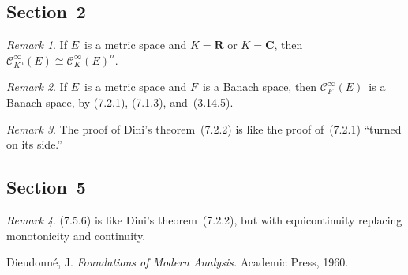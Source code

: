 \documentclass[letterpaper,12pt]{article}
\newcommand{\R}{\mathbf{R}}
\newcommand{\C}{\mathbf{C}}
\newcommand{\BC}{\mathcal{C}^{\infty}}
\newcommand{\iso}{\cong}
\theoremstyle{plain}
\theoremstyle{definition}
\theoremstyle{remark}
\newtheorem*{rmk}{Remark}
\begin{document}
\subsection*{Section~2}
\begin{rmk}
If \(E\)~is a metric space and \(K=\R\) or \(K=\C\), then \(\BC_{K^n}(E)\iso\BC_K(E)^n\).
\end{rmk}

\begin{rmk}
If \(E\)~is a metric space and \(F\)~is a Banach space, then \(\BC_F(E)\)~is a Banach space, by (7.2.1), (7.1.3), and~(3.14.5).
\end{rmk}

\begin{rmk}
The proof of Dini's theorem~(7.2.2) is like the proof of~(7.2.1) ``turned on its side.''
\end{rmk}

\subsection*{Section~5}
\begin{rmk}
(7.5.6) is like Dini's theorem~(7.2.2), but with equicontinuity replacing monotonicity and continuity.
\end{rmk}

\begin{thebibliography}{0}
 Dieudonn\'e, J. \textit{Foundations of Modern Analysis.} Academic Press, 1960.
\end{thebibliography}
\end{document}
